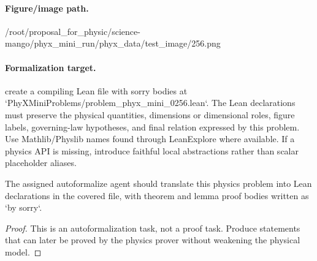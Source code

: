 \paragraph{Figure/image path.}
/root/proposal\_for\_physic/science-mango/phyx\_mini\_run/phyx\_data/test\_image/256.png

\paragraph{Formalization target.}
create a compiling Lean file with sorry bodies at `PhyXMiniProblems/problem\_phyx\_mini\_0256.lean`. The Lean declarations must preserve the physical quantities, dimensions or dimensional roles, figure labels, governing-law hypotheses, and final relation expressed by this problem.
Use Mathlib/Physlib names found through LeanExplore where available. If a physics API is missing, introduce faithful local abstractions rather than scalar placeholder aliases.

\begin{theorem}
\label{thm:physics:phyx_mini_0256:target}
The assigned autoformalize agent should translate this physics problem into Lean declarations in the covered file, with theorem and lemma proof bodies written as `by sorry`.
\end{theorem}
\begin{proof}
This is an autoformalization task, not a proof task. Produce statements that can later be proved by the physics prover without weakening the physical model.
\end{proof}

